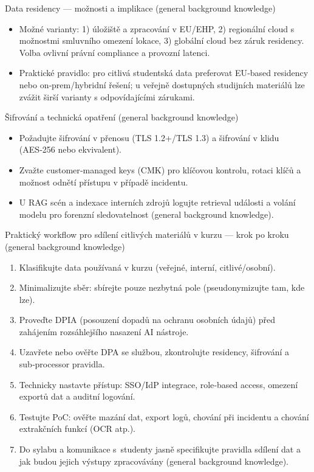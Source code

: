 \documentclass{report}%
\begin{document}
Data residency — možnosti a implikace (general background knowledge)
\begin{itemize}
  \item Možné varianty: 1) úložiště a zpracování v EU/EHP, 2) regionální cloud s možnostmi smluvního omezení lokace, 3) globální cloud bez záruk residency. Volba ovlivní právní compliance a provozní latenci.
  \item Praktické pravidlo: pro citlivá studentská data preferovat EU‑based residency nebo on‑prem/hybridní řešení; u veřejně dostupných studijních materiálů lze zvážit širší varianty s odpovídajícími zárukami.
\end{itemize}

Šifrování a technická opatření (general background knowledge)
\begin{itemize}
  \item Požadujte šifrování v přenosu (TLS 1.2+/TLS 1.3) a šifrování v klidu (AES‑256 nebo ekvivalent).
  \item Zvažte customer‑managed keys (CMK) pro klíčovou kontrolu, rotaci klíčů a možnost odnětí přístupu v případě incidentu.
  \item U RAG scén a indexace interních zdrojů logujte retrieval události a volání modelu pro forenzní sledovatelnost (general background knowledge).
\end{itemize}

Praktický workflow pro sdílení citlivých materiálů v kurzu — krok po kroku (general background knowledge)
\begin{enumerate}
  \item Klasifikujte data používaná v kurzu (veřejné, interní, citlivé/osobní).
  \item Minimalizujte sběr: sbírejte pouze nezbytná pole (pseudonymizujte tam, kde lze).
  \item Proveďte DPIA (posouzení dopadů na ochranu osobních údajů) před zahájením rozsáhlejšího nasazení AI nástroje.
  \item Uzavřete nebo ověřte DPA se službou, zkontrolujte residency, šifrování a sub‑processor pravidla.
  \item Technicky nastavte přístup: SSO/IdP integrace, role‑based access, omezení exportů dat a auditní logování.
  \item Testujte PoC: ověřte mazání dat, export logů, chování při incidentu a chování extrakčních funkcí (OCR atp.).
  \item Do sylabu a komunikace s studenty jasně specifikujte pravidla sdílení dat a jak budou jejich výstupy zpracovávány (general background knowledge).
\end{enumerate}
\end{document}
